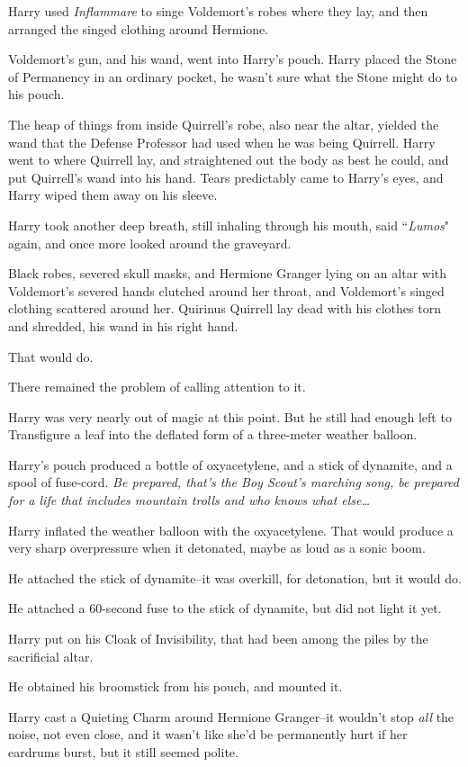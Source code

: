 Harry used \emph{Inflammare} to singe Voldemort's robes where they lay, and then arranged the singed clothing around Hermione.

Voldemort's gun, and his wand, went into Harry's pouch. Harry placed the Stone of Permanency in an ordinary pocket, he wasn't sure what the Stone might do to his pouch.

The heap of things from inside Quirrell's robe, also near the altar, yielded the wand that the Defense Professor had used when he was being Quirrell. Harry went to where Quirrell lay, and straightened out the body as best he could, and put Quirrell's wand into his hand. Tears predictably came to Harry's eyes, and Harry wiped them away on his sleeve.

Harry took another deep breath, still inhaling through his mouth, said ``\emph{Lumos}" again, and once more looked around the graveyard.

Black robes, severed skull masks, and Hermione Granger lying on an altar with Voldemort's severed hands clutched around her throat, and Voldemort's singed clothing scattered around her. Quirinus Quirrell lay dead with his clothes torn and shredded, his wand in his right hand.

That would do.

There remained the problem of calling attention to it.

Harry was very nearly out of magic at this point. But he still had enough left to Transfigure a leaf into the deflated form of a three-meter weather balloon.

Harry's pouch produced a bottle of oxyacetylene, and a stick of dynamite, and a spool of fuse-cord. \emph{Be prepared, that's the Boy Scout's marching song, be prepared for a life that includes mountain trolls and who knows what else{\ldots}}

Harry inflated the weather balloon with the oxyacetylene. That would produce a very sharp overpressure when it detonated, maybe as loud as a sonic boom.

He attached the stick of dynamite\---it was overkill, for detonation, but it would do.

He attached a 60-second fuse to the stick of dynamite, but did not light it yet.

Harry put on his Cloak of Invisibility, that had been among the piles by the sacrificial altar.

He obtained his broomstick from his pouch, and mounted it.

Harry cast a Quieting Charm around Hermione Granger\---it wouldn't stop \emph{all} the noise, not even close, and it wasn't like she'd be permanently hurt if her eardrums burst, but it still seemed polite.

